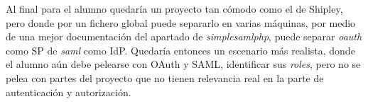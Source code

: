 \documentclass[]{article}
\begin{document}
\hfill


Al final para el alumno quedaría un proyecto tan cómodo como el de Shipley, pero donde por un fichero global puede separarlo en varias máquinas, por medio de una mejor documentación del apartado de \textit{simplesamlphp}, puede separar \textit{oauth} como SP de \textit{saml} como IdP. Quedaría entonces un escenario más realista, donde el alumno aún debe pelearse con OAuth y SAML, identificar sus \textit{roles}, pero no se pelea con partes del proyecto que no tienen relevancia real en la parte de autenticación y autorización.
\end{document}
